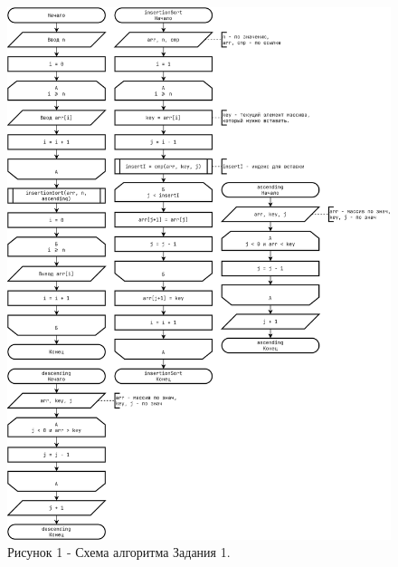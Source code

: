 \documentclass[oneside,a4paper,14pt]{extarticle}
\begin{document}
\newpage
\begin{figure}[!ht]
	\centering
	\includegraphics[height=0.9\textheight]{pics/flowchart1.png}
	\caption*{Рисунок 1 - Схема алгоритма Задания 1.}
\end{figure}
\end{document}

